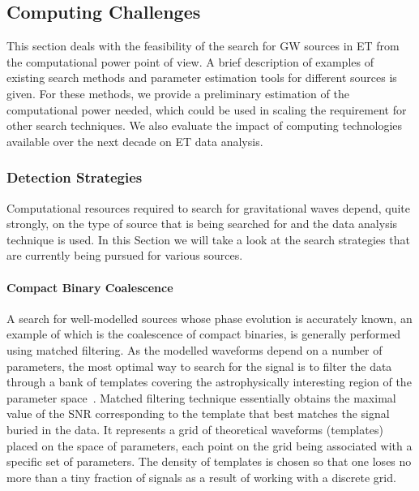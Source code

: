 \FloatBarrier
\subsection{Computing Challenges}

This section deals with the feasibility of the search for GW sources in ET from the 
computational power point of view. A brief description of examples of existing search 
methods and parameter estimation tools for different sources is given.
For these methods, we provide a preliminary estimation of the computational 
power needed, which could be used in scaling the requirement for other search techniques.
We also evaluate the impact of computing technologies available over the next decade
on ET data analysis.

\subsubsection{Detection Strategies}
Computational resources required to search for gravitational waves depend,
quite strongly, on the type of source that is being searched for and the
data analysis technique is used. In this Section we will take a look at the
search strategies that are currently being pursued for various sources.


\paragraph{Compact Binary Coalescence}  

A search for well-modelled sources whose phase evolution is accurately known,
an example of which is the coalescence of compact binaries,
is generally performed using matched filtering. 
As the modelled waveforms depend on a number of parameters, the most optimal 
way to search for the signal is to filter the data through a bank of templates 
covering the astrophysically interesting region of the parameter 
space~\cite{Sathyaprakash:1991mt,BSD2,owen97,Owen:1998dk,BABAK2006}. 
Matched filtering technique essentially obtains the maximal value of the 
SNR corresponding to the template that best matches the signal buried in the data.
It represents a grid of theoretical waveforms (templates) placed on the space 
of parameters, each point on the grid being associated with a specific set
of parameters. The density of templates is chosen so that one 
loses no more than a tiny fraction of signals as a result of working with a 
discrete grid.  

